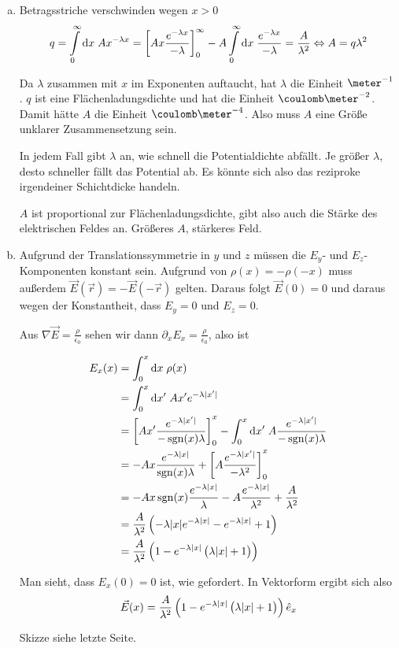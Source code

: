 \documentclass[a4paper,german,12pt,smallheadings]{scrartcl}
\begin{document}
\begin{enumerate}[a)]
\item
  Betragsstriche verschwinden wegen $x > 0$
  \begin{equation}
    q = \int\limits_0^\infty \dif x \; Ax^{-\lambda x} =
    \sbr[3]{A x \frac{e^{-\lambda x}}{-\lambda}}_0^\infty -
    A \int\limits_0^\infty \dif x \; \frac{e^{-\lambda x}}{-\lambda} = \frac{A}{\lambda^2} \Leftrightarrow A = q \lambda^2
  \end{equation}

  Da $\lambda$ zusammen mit $x$ im Exponenten auftaucht, hat $\lambda$ die
  Einheit $\meter^{-1}$. $q$ ist eine Flächenladungsdichte und hat die
  Einheit $\coulomb\meter^{-2}$. Damit hätte $A$ die Einheit
  $\coulomb\meter^{-4}$. Also muss $A$ eine Größe unklarer Zusammensetzung
  sein.

  In jedem Fall gibt $\lambda$ an, wie schnell die Potentialdichte abfällt. Je
  größer $\lambda$, desto schneller fällt das Potential ab. Es könnte sich also
  das reziproke irgendeiner Schichtdicke handeln.

  $A$ ist proportional zur Flächenladungsdichte, gibt also auch die Stärke des
  elektrischen Feldes an. Größeres $A$, stärkeres Feld.
\item
  Aufgrund der Translationssymmetrie in $y$ und $z$ müssen die $E_y$- und
  $E_z$-Komponenten konstant sein. Aufgrund von $\rho(x) = -\rho(-x)$ muss
  außerdem $\vec{E}(\vec{r}) = -\vec{E}(-\vec{r})$ gelten. Daraus folgt
  $\vec{E}(0) = 0$ und daraus wegen der Konstantheit, dass $E_y = 0$ und $E_z =
  0$.

  Aus $\nabla \vec{E} = \frac{\rho}{\epsilon_0}$ sehen wir dann $\partial_x E_x
  = \frac{\rho}{\epsilon_0}$, also ist

  \begin{align}
    E_x(x) &= \int_0^x \dif x \; \rho(x) \\
           &= \int_0^x \dif x' \; A x' e^{-\lambda |x'|} \\
           &= \sbr[3]{A x' \frac{e^{- \lambda |x'|}}{-\sgn(x)\lambda}}_0^x - \int_0^x \dif x' \; A \frac{e^{- \lambda |x'|}}{-\sgn(x)\lambda} \\
           &= -A x \frac{e^{- \lambda |x|}}{\sgn(x) \lambda} + \sbr[3]{ A \frac{e^{- \lambda |x'|}}{-\lambda^2}}_0^x \\
           &= -A x \sgn(x) \frac{e^{- \lambda |x|}}{\lambda} - A \frac{e^{- \lambda |x|}}{\lambda^2} + \frac{A}{\lambda^2} \\
           &= \frac{A}{\lambda^2} \del{-\lambda |x| e^{-\lambda |x|} - e^{-\lambda |x|} + 1} \\
           &= \frac{A}{\lambda^2} \del{1 - e^{-\lambda |x|}\del{\lambda |x| + 1}}
  \end{align}

  Man sieht, dass $E_x(0) = 0$ ist, wie gefordert. In Vektorform ergibt sich also
  \begin{equation}
    \vec{E}(x) = \frac{A}{\lambda^2} \del{1 - e^{-\lambda |x|}\del{\lambda |x| + 1}} \hat{e}_x
  \end{equation}

  Skizze siehe letzte Seite. %
\end{enumerate}
\end{document}
